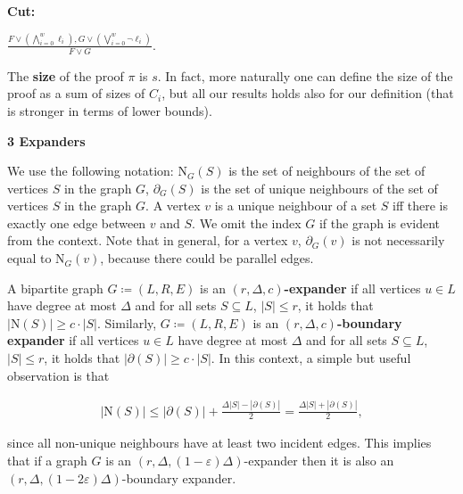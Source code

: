 \textbf{Cut:}



$\frac{F\vee(\bigwedge\limits_{i=0}^{w}\ell_{i}),G\vee(\bigvee\limits_{i=0}^{w}%
\neg\ell_{i})}{F\vee G}$.\par








The \textbf{size} of the proof $\pi$ is $s$. In fact, more naturally one can define the size of the
proof as a sum of sizes of $C_{i}$, but all our results holds also for our definition (that is stronger in
terms of lower bounds).\par






\par\medskip\noindent\textbf{
3 Expanders}\par




We use the following notation: $\mathrm{N}_{G}\left(S\right)$ is the set of neighbours of the set of vertices $S$ in the
graph $G$, $\partial_{G}(S)$ is the set of unique neighbours of the set of vertices $S$ in the graph $G$.
A vertex $v$ is a unique neighbour of a set $S$ iff there is exactly one edge between $v$ and $S$. We
omit the index $G$ if the graph is evident from the context. Note that in general, for a vertex $v$,
$\partial_{G}(v)$ is not necessarily equal to $\mathrm{N}_{G}\left(v\right)$, because there could be parallel edges.\par




A bipartite graph $G\coloneqq(L,R,E)$ is an $(r,\Delta,c)$\textbf{-expander} if all vertices $u\in L$ have degree at most $\Delta$ and for all sets $S\subseteq L$, $|S|\leq r$, it holds that
$|\mathrm{N}\left(S\right)|\geq c\cdot|S|$. Similarly, $G\coloneqq(L,R,E)$ is an
$(r,\Delta,c)$\textbf{-boundary expander} if all vertices $u\in L$ have degree at most $\Delta$ and
for all sets $S\subseteq L$, $|S|\leq r$, it holds that $|\partial(S)|\geq c\cdot|S|$. In this context,
a simple but useful observation is that\par


\[\begin{gathered}
|\mathrm{N}\left(S\right)|\leq|\partial(S)|+\frac{\Delta|S|-|\partial(S)|}{2}=%
\frac{\Delta|S|+|\partial(S)|}{2},
\end{gathered}\]


since all non-unique neighbours have at least two incident edges. This implies that if a graph $G$ is an
$(r,\Delta,(1-\varepsilon)\Delta)$-expander then it is also an $(r,\Delta,(1-2\varepsilon)\Delta)$-boundary expander.\par




